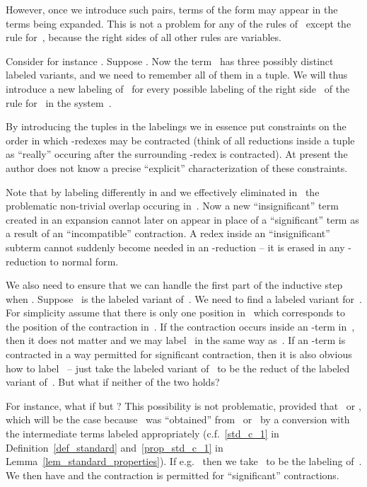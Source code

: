 \documentclass[a4paper,UKenglish]{lipics-v2016}
\begin{document}
\begin{itemize}
  However, once we introduce such pairs, terms of the form
   may appear in the terms being
  expanded. This is not a problem for any of the rules of~
  except the rule for~, because the right sides of all other
  rules are variables.

  Consider for instance
  . Suppose
  . Now the
  term~ has three possibly distinct labeled variants, and we need
  to remember all of them in a tuple. We will thus introduce a new
  labeling of~ for every possible labeling of the right
  side~ of the rule for~ in the system~.

  By introducing the tuples in the labelings we in essence put
  constraints on the order in which -redexes may be contracted
  (think of all reductions inside a tuple as ``really'' occuring after
  the surrounding -redex is contracted). At present the author
  does not know a precise ``explicit'' characterization of these
  constraints.
\end{itemize}
Note that by labeling  differently in  and
 we effectively eliminated in~ the problematic
non-trivial overlap occuring in~. Now a new ``insignificant''
term created in an expansion cannot later on appear in place of a
``significant'' term as a result of an ``incompatible'' contraction. A
redex inside an ``insignificant'' subterm cannot suddenly become
needed in an -reduction -- it is erased in any -reduction to
normal form.

We also need to ensure that we can handle the first part of the
inductive step when . Suppose~ is the labeled
variant of~. We need to find a labeled variant for~. For
simplicity assume that there is only one position in~ which
corresponds to the position of the contraction in~. If the
contraction occurs inside an -term in~, then it does not matter
and we may label~ in the same way as~. If an -term is
contracted in a way permitted for significant contraction, then it is
also obvious how to label~ -- just take the labeled variant
of~ to be the reduct of the labeled variant of~. But what if
neither of the two holds?

For instance, what if  but
? This possibility is not
problematic, provided that~ or ,
which will be the case because~ was ``obtained'' from~
or~ by a conversion with the intermediate terms labeled
appropriately (c.f.~\ref{std_c_1} in Definition~\ref{def_standard}
and~\ref{prop_std_c_1} in Lemma~\ref{lem_standard_properties}). If
e.g.~ then we take~ to be the labeling
of~. We then have 
and the contraction  is permitted for
``significant'' contractions.
\end{document}
